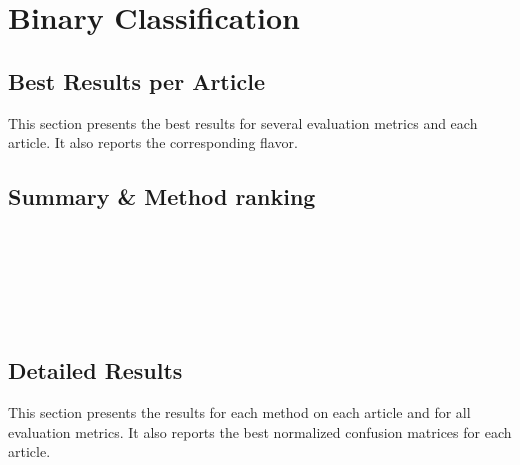 \documentclass{article}
\begin{document}
\section{Binary Classification}
\subsection{Best Results per Article}

This section presents the best results for several evaluation metrics and each article. It also reports the corresponding flavor.

	
	
	
	
	

\subsection{Summary \& Method ranking}

	\\
	\newpage
	\\
	\newpage
	\\
	\newpage
	\\
	\newpage
	\\
	\newpage

\subsection{Detailed Results}

This section presents the results for each method on each article and for all evaluation metrics.
It also reports the best normalized confusion matrices for each article.\\
\end{document}
